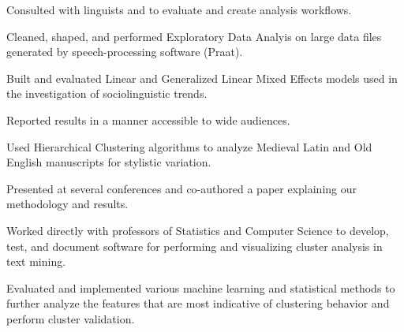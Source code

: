 \documentclass[letterpaper]{deedy-resume} %
\begin{document}
\begin{minipage}[t]{0.63\textwidth}
\sectionspace %


\begin{tightitemize}
\item Consulted with linguists and to evaluate and create analysis workflows.
\item Cleaned, shaped, and performed Exploratory Data Analyis on
  large data files generated by speech-processing software (Praat).
\item Built and evaluated Linear and Generalized Linear Mixed Effects
  models used in the
  investigation of sociolinguistic trends.
\item Reported results in a manner accessible to wide audiences.
\end{tightitemize}

\sectionspace %


\begin{tightitemize}
\item Used Hierarchical Clustering algorithms to analyze
  Medieval Latin and Old English manuscripts for stylistic variation.
\item Presented at several conferences and co-authored a paper
  explaining our methodology and results.
\end{tightitemize}

\sectionspace %


\begin{tightitemize}
\item Worked directly with professors of Statistics and Computer Science to
  develop, test, and document software for performing and visualizing
  cluster analysis in text mining.
\item Evaluated and implemented various machine learning and statistical
  methods to further analyze the features that are most indicative of
  clustering behavior and perform cluster validation.
\end{tightitemize}


\end{minipage}
\end{document}
